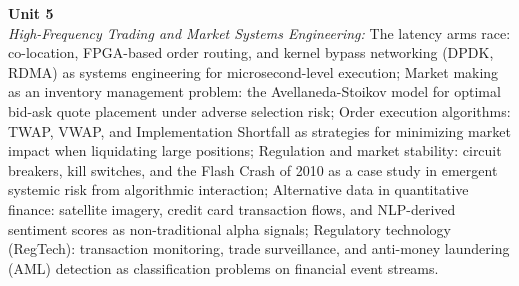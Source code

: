 \noindent\textbf{Unit 5} \\
\textit{High-Frequency Trading and Market Systems Engineering:} The latency arms race: co-location, FPGA-based order routing, and kernel bypass networking (DPDK, RDMA) as systems engineering for microsecond-level execution; Market making as an inventory management problem: the Avellaneda-Stoikov model for optimal bid-ask quote placement under adverse selection risk; Order execution algorithms: TWAP, VWAP, and Implementation Shortfall as strategies for minimizing market impact when liquidating large positions; Regulation and market stability: circuit breakers, kill switches, and the Flash Crash of 2010 as a case study in emergent systemic risk from algorithmic interaction; Alternative data in quantitative finance: satellite imagery, credit card transaction flows, and NLP-derived sentiment scores as non-traditional alpha signals; Regulatory technology (RegTech): transaction monitoring, trade surveillance, and anti-money laundering (AML) detection as classification problems on financial event streams.

\newpage
{}
